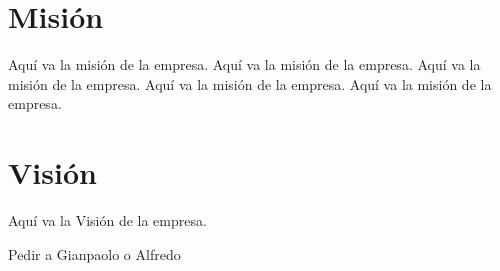 \section{Misión} \label{sect:Mision}
Aquí va la misión de la empresa. 
Aquí va la misión de la empresa. 
Aquí va la misión de la empresa. 
Aquí va la misión de la empresa. 
Aquí va la misión de la empresa. 

\section{Visión} \label{sect:Vision}
Aquí va la Visión de la empresa. 

Pedir a Gianpaolo o Alfredo
